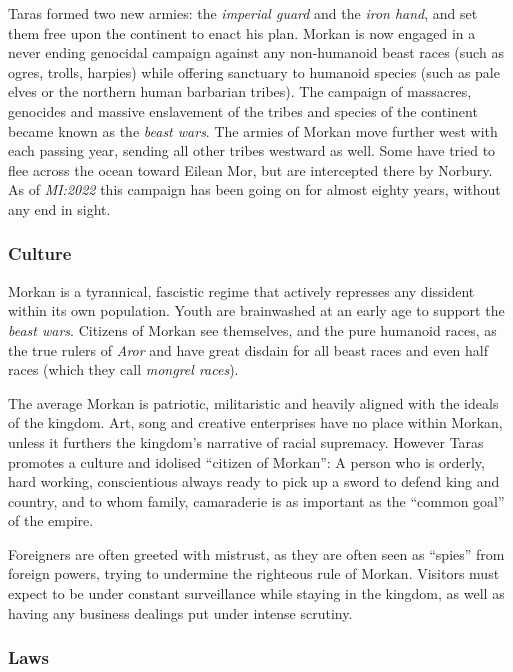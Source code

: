 Taras formed two new armies: the \emph{imperial guard} and the \emph{iron
  hand}, and set them free upon the continent to enact his plan. Morkan is now
engaged in a never ending genocidal campaign against any non-humanoid beast
races (such as ogres, trolls, harpies) while offering sanctuary to humanoid
species (such as pale elves or the northern human barbarian tribes). The
campaign of massacres, genocides and massive enslavement of the tribes and
species of the continent became known as the \emph{beast wars}. The armies of
Morkan move further west with each passing year, sending all other tribes
westward as well. Some have tried to flee across the ocean toward Eilean Mor,
but are intercepted there by Norbury. As of \emph{MI:2022} this campaign has
been going on for almost eighty years, without any end in sight.

\subsubsection*{Culture}

Morkan is a tyrannical, fascistic regime that actively represses any dissident
within its own population. Youth are brainwashed at an early age to support
the \emph{beast wars}. Citizens of Morkan see themselves, and the pure
humanoid races, as the true rulers of \emph{Aror} and have great disdain for
all beast races and even half races (which they call \emph{mongrel races}).

The average Morkan is patriotic, militaristic and heavily aligned with the
ideals of the kingdom. Art, song and creative enterprises have no place within
Morkan, unless it furthers the kingdom's narrative of racial supremacy. However
Taras promotes a culture and idolised ``citizen of Morkan'': A person who is
orderly, hard working, conscientious always ready to pick up a sword to defend
king and country, and to whom family, camaraderie is as important as the
``common goal'' of the empire.

Foreigners are often greeted with mistrust, as they are often seen as
``spies'' from foreign powers, trying to undermine the righteous rule of
Morkan. Visitors must expect to be under constant surveillance while staying
in the kingdom, as well as having any business dealings put under intense
scrutiny.

\subsubsection*{Laws}

